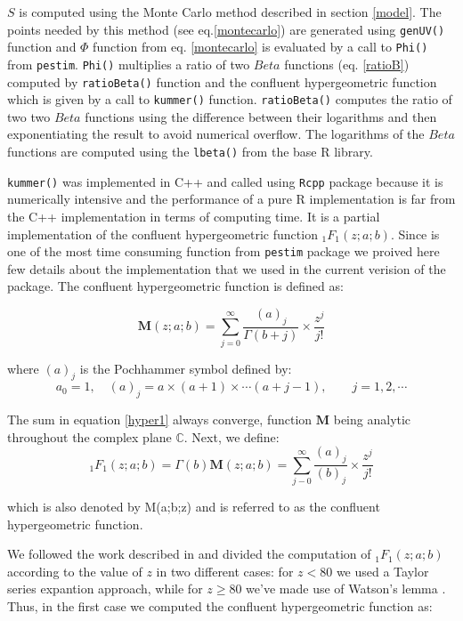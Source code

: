 \documentclass[12pt, a4paper]{article}
\begin{document}
$S$ is computed using the Monte Carlo method described in section \ref{model}. The points needed by this 
method (see eq.\ref{montecarlo}) are generated using \texttt{genUV()} function and $\Phi$ function 
from eq. \ref{montecarlo} is evaluated by a call to \texttt{Phi()} 
from \texttt{pestim}. \texttt{Phi()} multiplies a ratio of two $Beta$ functions (eq. \ref{ratioB}) computed 
by \texttt{ratioBeta()} function and the confluent hypergeometric function which is given by a call to \texttt{kummer()} function. 
\texttt{ratioBeta()} computes the ratio of two two $Beta$ functions using the difference between 
their logarithms and then exponentiating the result to avoid numerical overflow. The logarithms of 
the $Beta$ functions are computed using the \texttt{lbeta()} from the base R library.

\texttt{kummer()}  was implemented in C++ and called using \texttt{Rcpp} package because it is numerically 
intensive and the performance of a pure R implementation is far from the C++ implementation in terms of 
computing time.  It is a partial implementation of the confluent hypergeometric function ${}_{1}F_{1}(z ; a; b)$. Since 
is one of the most time consuming function from \texttt{pestim} package we proived here few details about the 
implementation that we used in the current verision of the package.
The confluent hypergeometric function is defined as:

\begin{equation}\label{hyper1}
\mathbf{M}(z; a; b)= \sum_{j=0}^{\infty} \frac{(a)_{j}}{\Gamma(b+j)} \times \frac{z^{j}}{j!}
\end{equation}

\noindent where $(a)_{j}$ is the Pochhammer symbol defined by:
\begin{equation}
a_{0} = 1, \quad  (a)_{j} = a \times (a+1) \times \cdots (a+j-1), \qquad j=1,2,\cdots
\end{equation}

The sum in equation \ref{hyper1} always converge, function $\mathbf{M}$ being analytic 
throughout the complex plane $\mathbb{C}$. Next, we define:
\begin{equation}
{}_{1}F_{1}(z; a; b) = \Gamma(b) \mathbf{M}(z; a; b) = \sum_{j-0}^{\infty}\frac{(a)_{j}}{(b)_{j}} \times \frac{z^{j}}{j!}
\end{equation}

\noindent which is also denoted by M(a;b;z) and is referred to as the confluent hypergeometric function.

We followed the work described in \cite{hyper} and divided the computation of ${}_{1}F_{1}(z ; a; b)$ according to 
the value of $z$ in two different cases: for $z < 80$ we used a Taylor series expantion approach, 
while for $z \ge 80$ we've made use of Watson’s lemma \cite{watson}.
Thus, in the first case we computed the confluent hypergeometric function as:
\end{document}
